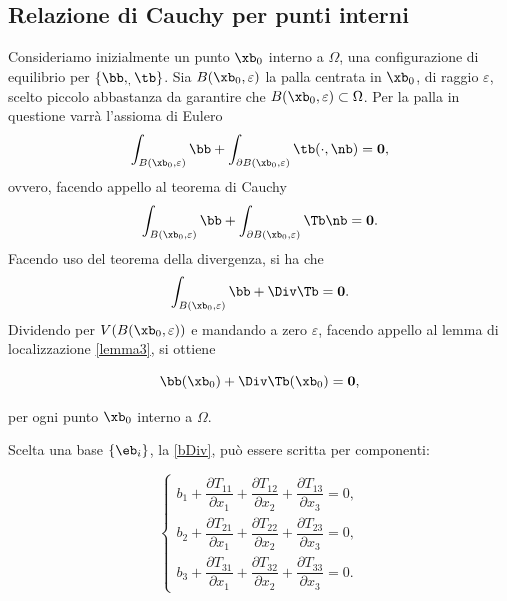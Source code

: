 \subsection{Relazione di Cauchy per punti interni}
Consideriamo inizialmente un punto $\xb_0$ interno a $\Omega$, una configurazione di equilibrio per $\{\bb, \sb, \tb\}$. Sia $B(\xb_0,\varepsilon)$ la palla centrata in $\xb_0$, di raggio $\varepsilon$,  scelto piccolo abbastanza da garantire che $B(\xb_0,\varepsilon)\subset\Omega$. Per la palla in questione varrà l'assioma di Eulero
\begin{equation}
	\int_{B(\xb_0,\varepsilon)}\bb+\int_{\partial B(\xb_0,\varepsilon)}\tb (\cdot, \nb)=\mathbf{0},
\end{equation}
ovvero, facendo appello al teorema di Cauchy
\begin{equation}
		\int_{B(\xb_0,\varepsilon)}\bb+\int_{\partial B(\xb_0,\varepsilon)}\Tb\nb =\mathbf{0}.
\end{equation}
Facendo uso del teorema della divergenza, si ha che
\begin{equation}\label{eq1int}
	\int_{B(\xb_0,\varepsilon)}\bb+\Div\Tb=\mathbf{0}.
\end{equation}
Dividendo per $V(B(\xb_0,\varepsilon))$ e mandando a zero $\varepsilon$, facendo appello al lemma di localizzazione \eqref{lemma3}, si ottiene
\begin{definition}
	\begin{equation}\label{bDiv}
\bb(\xb_0)+\Div\Tb(\xb_0)=\mathbf{0},
\end{equation}
\end{definition}
per ogni punto $\xb_0$ interno a $\Omega$.

Scelta una base $\{\eb_i\}$, la \eqref{bDiv}, può essere scritta per componenti:
\begin{definition}
	\begin{equation}
	\begin{cases}b_{1}+\dfrac{\partial T_{11}}{\partial x_{1}}+\dfrac{\partial T_{12}}{\partial x_{2}}+\dfrac{\partial T_{13}}{\partial x_{3}}=0,\\[.3cm]
	b_{2}+	\dfrac{\partial T_{21}}{\partial x_{1}}+\dfrac{\partial T_{22}}{\partial x_{2}}+\dfrac{\partial T_{23}}{\partial x_{3}}=0,\\[.3cm]
	b_{3}+	\dfrac{\partial T_{31}}{\partial x_{1}}+\dfrac{\partial T_{32}}{\partial x_{2}}+\dfrac{\partial T_{33}}{\partial x_{3}}=0.
	\end{cases}
\end{equation}
\end{definition}


